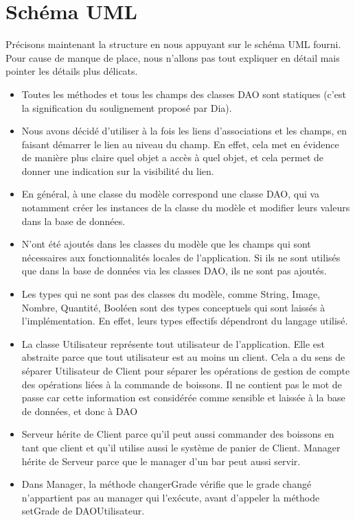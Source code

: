 \documentclass[a4paper,10pt]{article}
\begin{document}
\section{Schéma UML}

Précisons maintenant la structure en nous appuyant sur le schéma UML fourni. Pour cause de manque de place, nous n'allons pas tout expliquer en détail mais pointer les détails plus délicats.

\begin{itemize}
    \item Toutes les méthodes et tous les champs des classes DAO sont statiques (c'est la signification du soulignement proposé par Dia).
    \item Nous avons décidé d'utiliser à la fois les liens d'associations et les champs, en faisant démarrer le lien au niveau du champ. En effet, cela met en évidence de manière plus claire quel objet a accès à quel objet, et cela permet de donner une indication sur la visibilité du lien.
    \item En général, à une classe du modèle correspond une classe DAO, qui va notamment créer les instances de la classe du modèle et modifier leurs valeurs dans la base de données.
    \item N'ont été ajoutés dans les classes du modèle que les champs qui sont nécessaires aux fonctionnalités locales de l'application. Si ils ne sont utilisés que dans la base de données via les classes DAO, ils ne sont pas ajoutés.
    \item Les types qui ne sont pas des classes du modèle, comme String, Image, Nombre, Quantité, Booléen sont des types conceptuels qui sont laissés à l'implémentation. En effet, leurs types effectifs dépendront du langage utilisé.
    \item La classe Utilisateur représente tout utilisateur de l'application. Elle est abstraite parce que tout utilisateur est au moins un client. Cela a du sens de séparer Utilisateur de Client pour séparer les opérations de gestion de compte des opérations liées à la commande de boissons. Il ne contient pas le mot de passe car cette information est considérée comme sensible et laissée à la base de données, et donc à DAO
    \item Serveur hérite de Client parce qu'il peut aussi commander des boissons en tant que client et qu'il utilise aussi le système de panier de Client. Manager hérite de Serveur parce que le manager d'un bar peut aussi servir.
    \item Dans Manager, la méthode changerGrade vérifie que le grade changé n'appartient pas au manager qui l'exécute, avant d'appeler la méthode setGrade de DAOUtilisateur.

\end{itemize}
\end{document}
